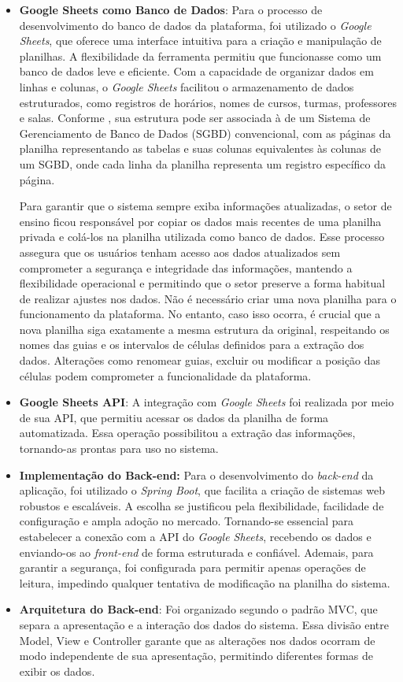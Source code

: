 \begin{itemize}
    \item \textbf{Google Sheets como Banco de Dados}: Para o processo de desenvolvimento do banco de dados da plataforma, foi utilizado o \textit{Google Sheets}, que oferece uma interface intuitiva para a criação e manipulação de planilhas. A flexibilidade da ferramenta permitiu que funcionasse como um banco de dados leve e eficiente. Com a capacidade de organizar dados em linhas e colunas, o \textit{Google Sheets} facilitou o armazenamento de dados estruturados, como registros de horários, nomes de cursos, turmas, professores e salas. Conforme , sua estrutura pode ser associada à de um Sistema de Gerenciamento de Banco de Dados (SGBD) convencional, com as páginas da planilha representando as tabelas e suas colunas equivalentes às colunas de um SGBD, onde cada linha da planilha representa um registro específico da página.

    Para garantir que o sistema sempre exiba informações atualizadas, o setor de ensino ficou responsável por copiar os dados mais recentes de uma planilha privada e colá-los na planilha utilizada como banco de dados. Esse processo assegura que os usuários tenham acesso aos dados atualizados sem comprometer a segurança e integridade das informações, mantendo a flexibilidade operacional e permitindo que o setor preserve a forma habitual de realizar ajustes nos dados. Não é necessário criar uma nova planilha para o funcionamento da plataforma. No entanto, caso isso ocorra, é crucial que a nova planilha siga exatamente a mesma estrutura da original, respeitando os nomes das guias e os intervalos de células definidos para a extração dos dados. Alterações como renomear guias, excluir ou modificar a posição das células podem comprometer a funcionalidade da plataforma.
    
    \item \textbf{Google Sheets API}: A integração com \textit{Google Sheets} foi realizada por meio de sua API, que permitiu acessar os dados da planilha de forma automatizada. Essa operação possibilitou a extração das informações, tornando-as prontas para uso no sistema.
    \item \textbf{Implementação do Back-end:} Para o desenvolvimento do \textit{back-end} da aplicação, foi utilizado o \textit{Spring Boot}, que facilita a criação de sistemas web robustos e escaláveis. A escolha se justificou pela flexibilidade, facilidade de configuração e ampla adoção no mercado. Tornando-se essencial para estabelecer a conexão com a API do \textit{Google Sheets}, recebendo os dados e enviando-os ao \textit{front-end} de forma estruturada e confiável. Ademais, para garantir a segurança, foi configurada para permitir apenas operações de leitura, impedindo qualquer tentativa de modificação na planilha do sistema.
    \item \textbf{Arquitetura do Back-end}: Foi organizado segundo o padrão MVC, que separa a apresentação e a interação dos dados do sistema. Essa divisão entre Model, View e Controller garante que as alterações nos dados ocorram de modo independente de sua apresentação, permitindo diferentes formas de exibir os dados.
\end{itemize}


